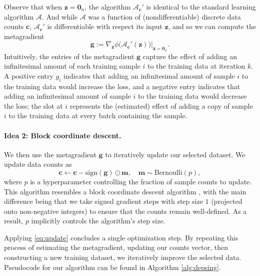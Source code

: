 Observe that when $\mathbf{z} = \mathbf{0}_n$, the algorithm
$\mathcal{A}_\mathbf{c}'$  is identical to the standard learning algorithm
$\mathcal{A}$. And while $\mathcal{A}$ was a function of (nondifferentiable)
discrete data counts $\mathbf{c}$, $\mathcal{A}_\mathbf{c}'$ is differentiable
with respect
its input $\mathbf{z}$, and so we can compute the metagradient
\[
  \mathbf{g} := \nabla_{\mathbf{z}}
  \phi\big(\mathcal{A}_\mathbf{c}'(\mathbf{z})\big)\big\vert_{\mathbf{z}
  = \mathbf{0}_n}.
\]
Intuitively, the entries of the metagradient $\mathbf{g}$ capture the effect of
adding an infinitesimal amount of each training sample $i$ to the training data
at iteration $k$. A positive entry $g_i$ indicates that adding an infinitesimal
amount of sample $i$ to the training data would increase the loss,  and a
negative entry indicates that adding an infinitesimal amount of sample $i$ to
the training data would decrease the loss; the slot at $i$ represents the
(estimated) effect of adding a copy of sample $i$ to the training
data at every batch containing the sample.

\paragraph{Idea 2: Block coordinate descent.}
We then use the metagradient $\mathbf{g}$ to iteratively update our selected
dataset. We update data counts as
\begin{equation}
  \label{eq:update}
  \mathbf{c} \gets \mathbf{c} - \mathrm{sign}(\mathbf{g}) \odot
  \mathbf{m}, \quad \mathbf{m} \sim \mathrm{Bernoulli}(p),
\end{equation}
where $p$ is a hyperparameter controlling the fraction of sample counts to
update. This algorithm resembles a block coordinate descent algorithm
\citep{ortega2000iterative}, with the main difference being that we take signed
gradient steps with step size $1$ (projected onto non-negative integers) to
ensure that the counts remain well-defined. As a result, $p$ implicitly controls
the algorithm's step size.

Applying \eqref{eq:update} concludes a single optimization step.
By repeating this process of estimating the metagradient, updating our
counts vector, then constructing a new training dataset, we iteratively
improve the selected data.  Pseudocode for our algorithm can be found in Algorithm \ref{alg:depsing}.

